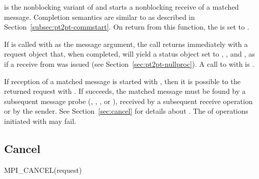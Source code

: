  is the nonblocking variant of 
and starts a nonblocking receive of a matched message. Completion
semantics are similar to  as described in
Section~\ref{subsec:pt2pt-commstart}. On return from this function,
the  is set to .

If  is called with 
as the message argument, the call returns immediately with a request
object that, when completed, will yield a status object set to
\mpicode{ = }, \mpicode{ = },
and , as if a receive from 
was issued (see Section~\ref{sec:pt2pt-nullproc}).
A call to  with  is .

\begin{implementors}
If reception of a matched message is started with
, then it is possible to  the returned
request with . If  succeeds, the
matched message must be found by a subsequent message probe
(, , , or
), received by a subsequent receive operation or
 by the sender.
See Section~\ref{sec:cancel} for details about .
The  of operations initiated with  may
fail.
\end{implementors}

\subsection{Cancel}
\label{sec:cancel}

\begin{funcdef}{MPI\_CANCEL}{(\mbox{request})}
\end{funcdef}

